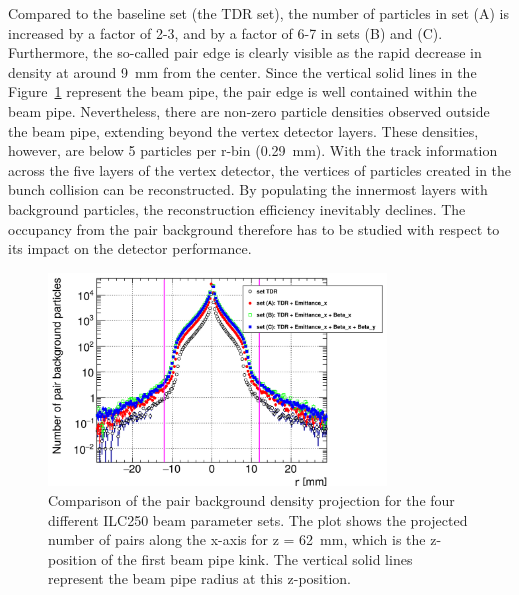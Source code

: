 Compared to the baseline set (the TDR set), the number of particles in set (A) is increased by a factor of 2-3, and by a factor of 6-7 in sets (B) and (C).
Furthermore, the so-called pair edge is clearly visible as the rapid decrease in density at around \SI{9}{\milli\meter} from the center.
Since the vertical solid lines in the Figure~\ref{fig:PairBkg:Density_Projection} represent the beam pipe, the pair edge is well contained within the beam pipe.
Nevertheless, there are non-zero particle densities observed outside the beam pipe, extending beyond the vertex detector layers.
These densities, however, are below 5 particles per r-bin (\SI{0.29}{\milli\meter}).
With the track information across the five layers of the vertex detector, the vertices of particles created in the bunch collision can be reconstructed.
By populating the innermost layers with background particles, the reconstruction efficiency inevitably declines.
The occupancy from the pair background therefore has to be studied with respect to its impact on the detector performance.
\begin{figure}
    \centering
    \includegraphics[width=0.8\textwidth]{Figures/Pairs/HelixEnvelope_Projection_Comparison_250GeV_parametersets_LEG.png}
    \caption[Pair background density projection for different ILC250 beam parameter sets]{
    Comparison of the pair background density projection for the four different ILC250 beam parameter sets.
    The plot shows the projected number of pairs along the x-axis for z = \SI[detect-all]{62}{\milli\meter}, which is the z-position of the first beam pipe kink.
    The vertical solid lines represent the beam pipe radius at this z-position.
    }
    \label{fig:PairBkg:Density_Projection}
\end{figure}

